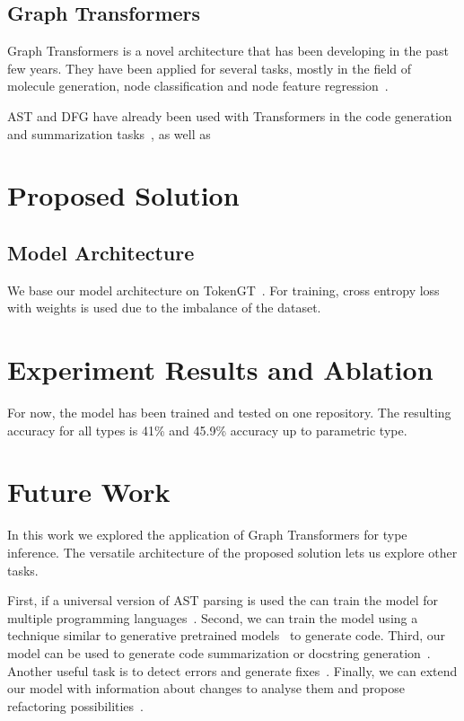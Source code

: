\documentclass[conference]{IEEEtran}
\begin{document}
\subsection{Graph Transformers}\label{subsec:graph-transformers}

Graph Transformers is a novel architecture that has been developing in the past few years.
They have been applied for several tasks, mostly in the field of molecule generation, node classification and node feature regression~\cite{kim_pure_2022,kreuzer_rethinking_2021,dwivedi_generalization_2021,ying_transformers_2021}.

AST and DFG have already been used with Transformers in the code generation and summarization tasks~\cite{wang_unified_2022,tang_ast-transformer_2021,sun_treegen_2020},
as well as

\section{Proposed Solution}\label{sec:proposed-solution}

\subsection{Model Architecture}\label{subsec:model-architecture}

We base our model architecture on TokenGT~\cite{kim_pure_2022}.
For training, cross entropy loss with weights is used due to the imbalance of the dataset.

\section{Experiment Results and Ablation}\label{sec:experiment-results-and-ablation}

For now, the model has been trained and tested on one repository.
The resulting accuracy for all types is 41\% and 45.9\% accuracy up to parametric type.

\section{Future Work}\label{sec:future-work}

In this work we explored the application of Graph Transformers for type inference.
The versatile architecture of the proposed solution lets us explore other tasks.

First, if a universal version of AST parsing is used the can train the model for multiple programming languages~\cite{wang_unified_2022}.
Second, we can train the model using a technique similar to generative pretrained models~\cite{radford_language_2019,brown_language_2020} to generate code.
Third, our model can be used to generate code summarization or docstring generation~\cite{barone_parallel_2017,liu_haconvgnn_2021}.
Another useful task is to detect errors and generate fixes~\cite{bhatia_automated_2016,fujimoto_addressing_2018,marginean_sapfix_2019}.
Finally, we can extend our model with information about changes to analyse them and propose refactoring possibilities~\cite{cabrera_lozoya_commit2vec_2021}.
\end{document}

